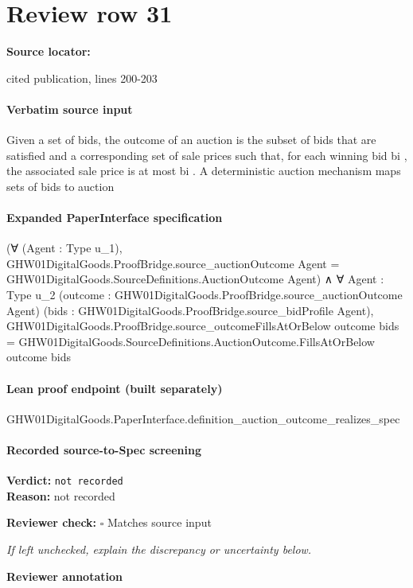 \documentclass[10pt]{article}
\newcommand{\reviewerbox}{%
  \par\noindent\fbox{\parbox{0.96\linewidth}{\rule{0pt}{0.38in}}}\par
}
\newcommand{\reviewmatch}[1]{%
  \par\noindent\textbf{Reviewer check:} $\square$\; #1\par
  \noindent\emph{If left unchecked, explain the discrepancy or uncertainty below.}\par
}
\begin{document}
\section*{Review row 31}
\textbf{Source locator:} {\footnotesize\raggedright cited publication, lines 200-\allowbreak{}203\par}
\paragraph{Verbatim source input}
\begin{ReviewVerbatim}
Given a set of bids, the outcome of an auction is the
subset of bids that are satisfied and a corresponding
set of sale prices such that, for each winning bid bi ,
the associated sale price is at most bi . A deterministic auction mechanism maps sets of bids to auction
\end{ReviewVerbatim}


\paragraph{Expanded PaperInterface specification}
\begin{ReviewVerbatim}
(∀ (Agent : Type u_1),
    GHW01DigitalGoods.ProofBridge.source_auctionOutcome Agent =
      GHW01DigitalGoods.SourceDefinitions.AuctionOutcome Agent) ∧
  ∀ {Agent : Type u_2} (outcome : GHW01DigitalGoods.ProofBridge.source_auctionOutcome Agent)
    (bids : GHW01DigitalGoods.ProofBridge.source_bidProfile Agent),
    GHW01DigitalGoods.ProofBridge.source_outcomeFillsAtOrBelow outcome bids =
      GHW01DigitalGoods.SourceDefinitions.AuctionOutcome.FillsAtOrBelow outcome bids
\end{ReviewVerbatim}

\paragraph{Lean proof endpoint (built separately)}\begin{ReviewVerbatim}
GHW01DigitalGoods.PaperInterface.definition_auction_outcome_realizes_spec
\end{ReviewVerbatim}

\paragraph{Recorded source-to-Spec screening}
\textbf{Verdict:} \texttt{not recorded}
\\
\textbf{Reason:} not recorded
\reviewmatch{Matches source input}
\noindent\textbf{Reviewer annotation}\par
\reviewerbox
\clearpage
\hypertarget{source-claim-3182def2fd3126fc}{}
\end{document}
